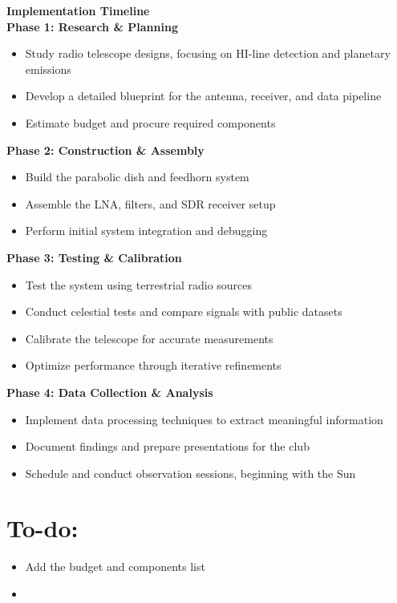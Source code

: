 \documentclass[12pt]{report}
\begin{document}
    \begin{flushleft}
    {\Large \textbf{Implementation Timeline}}\\[1em]

    \textbf{Phase 1: Research \& Planning}
    \begin{itemize}[leftmargin=1.5em]
        \item Study radio telescope designs, focusing on HI-line detection and planetary emissions
        \item Develop a detailed blueprint for the antenna, receiver, and data pipeline
        \item Estimate budget and procure required components
    \end{itemize}

    \textbf{Phase 2: Construction \& Assembly}
    \begin{itemize}[leftmargin=1.5em]
        \item Build the parabolic dish and feedhorn system
        \item Assemble the LNA, filters, and SDR receiver setup
        \item Perform initial system integration and debugging
    \end{itemize}

    \textbf{Phase 3: Testing \& Calibration}
    \begin{itemize}[leftmargin=1.5em]
        \item Test the system using terrestrial radio sources
        \item Conduct celestial tests and compare signals with public datasets
        \item Calibrate the telescope for accurate measurements
        \item Optimize performance through iterative refinements
    \end{itemize}

    \textbf{Phase 4: Data Collection \& Analysis}
    \begin{itemize}[leftmargin=1.5em]
        \item Implement data processing techniques to extract meaningful information
        \item Document findings and prepare presentations for the club
        \item Schedule and conduct observation sessions, beginning with the Sun
    \end{itemize}

    \section*{To-do:}
    \begin{itemize}
        \item Add the budget and components list
        \item 
    \end{itemize}
    \end{flushleft}
\end{document}
